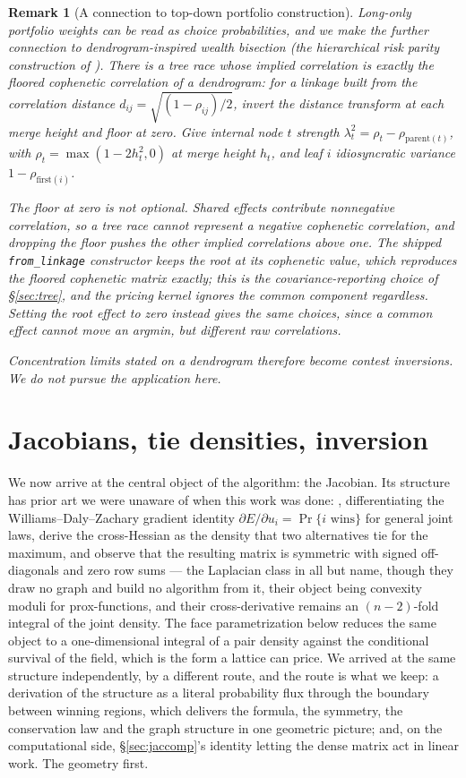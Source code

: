 \documentclass[11pt]{article}
\newtheorem{remark}{Remark}
\begin{document}
\begin{remark}[A connection to top-down portfolio construction]\label{rem:hrp}
Long-only portfolio weights can be read as choice probabilities, and we make the further connection to dendrogram-inspired wealth bisection (the hierarchical risk parity construction of \citet{lopezdeprado2016}).
There is a tree race whose implied correlation is exactly the
\emph{floored} cophenetic correlation of a dendrogram: for a linkage
built from the correlation distance $d_{ij}=\sqrt{(1-\rho_{ij})/2}$,
invert the distance transform at each merge height and floor at zero. Give internal node $t$ strength
$\lambda_t^2=\rho_t-\rho_{\mathrm{parent}(t)}$, with
$\rho_t=\max(1-2h_t^2,0)$ at merge height $h_t$, and leaf $i$
idiosyncratic variance $1-\rho_{\mathrm{first}(i)}$.

The floor at zero is not optional. Shared effects contribute nonnegative
correlation, so a tree race cannot represent a negative cophenetic
correlation, and dropping the floor pushes the other implied correlations
above one. The shipped \texttt{from\_linkage} constructor keeps the root at its
cophenetic value, which reproduces the floored cophenetic matrix exactly;
this is the covariance-reporting choice of \S\ref{sec:tree}, and the
pricing kernel ignores the common component regardless. Setting the root
effect to zero instead gives the same choices, since a common effect
cannot move an argmin, but different raw correlations.

Concentration limits stated on a dendrogram therefore become contest
inversions. We do not pursue the application here.
\end{remark}

\section{Jacobians, tie densities, inversion}\label{sec:jac}

We now arrive at the central object of the algorithm: the Jacobian. Its
structure has prior art we were unaware of when this work was done:
\citet{muller2022}, differentiating the Williams--Daly--Zachary
gradient identity $\partial E/\partial u_i=\Pr\{i \text{ wins}\}$ for
general joint laws, derive the cross-Hessian as the density that two
alternatives tie for the maximum, and observe that the resulting matrix
is symmetric with signed off-diagonals and zero row sums --- the
Laplacian class in all but name, though they draw no graph and build no
algorithm from it, their object being convexity moduli for
prox-functions, and their cross-derivative remains an $(n-2)$-fold
integral of the joint density. The face parametrization below reduces
the same object to a one-dimensional integral of a pair density against
the conditional survival of the field, which is the form a lattice can
price. We arrived at
the same structure independently, by a different route, and the route is
what we keep: a derivation of the structure as a literal probability
flux through the boundary between winning regions,
which delivers the formula, the symmetry, the conservation law and the
graph structure in one geometric picture; and, on the computational
side, \S\ref{sec:jaccomp}'s identity letting the dense matrix act in
linear work. The geometry first.
\end{document}

